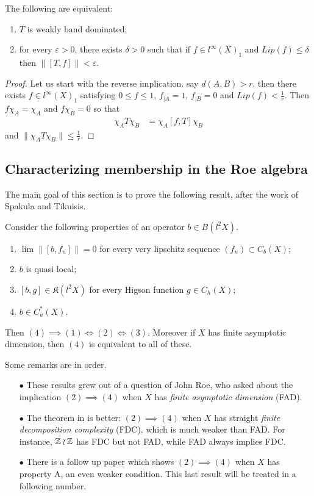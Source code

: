 \begin{thm}[Folklore]
The following are equivalent:
\begin{enumerate}
\item $T$ is weakly band dominated;
\item for every $\varepsilon>0$, there exists $\delta>0$ such that if $f\in l^\infty(X)_1$ and $Lip(f)\leq \delta$ then $\| [T,f] \| <\varepsilon$.
\end{enumerate}
\end{thm}

\begin{proof}
Let us start with the reverse implication. say $d(A,B)> r$, then there exists $f\in l^\infty(X)_1$ satisfying $0\leq f \leq 1$, $f_{|A}=1$, $f_{|B}=0$ and $Lip(f)< \frac{1}{r}$. Then $f\chi_A = \chi_A$ and $f\chi_B = 0$ so that 
\[\begin{split}
\chi_A T \chi_B & = \chi_A [f,T]\chi_B
\end{split}\] 
and $\| \chi_A T\chi_B \| \leq \frac{1}{r}$.
\end{proof}

\subsection{Characterizing membership in the Roe algebra}

The main goal of this section is to prove the following result, after the work of Spakula and Tikuisis.

\begin{thm}
Consider the following properties of an operator $b\in B(l^2 X)$.
\begin{enumerate}
\item $\lim \| [b , f_n] \| =0  $ for every very lipschitz sequence $(f_n) \subset C_b(X)$;
\item $b$ is quasi local;
\item $[b , g ] \in \mathfrak K( l^2X)$ for every Higson function $g\in C_h(X)$;
\item $b \in C^*_u(X)$. 
\end{enumerate} 
Then $(4) \implies (1) \iff (2) \iff (3) $. Moreover if $X$ has finite asymptotic dimension, then $(4)$ is equivalent to all of these.
\end{thm}

Some remarks are in order. 
\begin{itemize}
\item[$\bullet$] These results grew out of a question of John Roe, who asked about the implication $(2) \implies (4)$ when $X$ has \textit{finite asymptotic dimension} (FAD).
\item[$\bullet$] The theorem in \cite{SpakulaTikuisis} is better: $(2)\implies (4)$ when $X$ has straight \textit{finite decomposition complexity} (FDC), which is much weaker than FAD. For instance, $\mathbb Z \wr \mathbb Z$ has FDC but not FAD, while FAD always implies FDC.
\item[$\bullet$] There is a follow up paper which shows $(2)\implies (4)$ when $X$ has property A, an even weaker condition. This last result will be treated in a following number.
\end{itemize}

